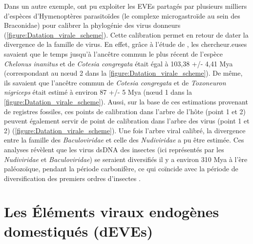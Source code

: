 Dans un autre exemple, \cite{theze_paleozoic_2011} ont  pu exploiter les EVEs partagés par plusieurs milliers d'espèces d'Hymenoptères parasitoïdes (le complexe microgastroïde au sein des Braconidae) pour calibrer la phylogénie des virus donneurs (\figurename{\ref{figure:Datation_virale_scheme}}). Cette calibration permet en retour de dater la divergence de la famille de virus. En effet, grâce à l'étude de \citep{murphy_phylogeny_2008}, les chercheur.euses savaient que le temps jusqu'à l'ancêtre commun le plus récent de l'espèce \textit{Chelonus inanitus} et de \textit{Cotesia congregata} était égal à 103,38 +/- 4,41 Mya (correspondant au nœud 2 dans la \figurename{\ref{figure:Datation_virale_scheme}}). De même, ils savaient que l'ancêtre commun de \textit{Cotesia congregata} et de \textit{Toxoneuron nigriceps} était estimé à environ 87 +/- 5 Mya (nœud 1 dans la \figurename{\ref{figure:Datation_virale_scheme}}). Aussi, sur la base de ces estimations provenant de registres fossiles, ces points de calibration dans l'arbre de l'hôte (point 1 et 2) peuvent également servir de point de calibration dans l'arbre des virus (point 1 et 2) (\figurename{\ref{figure:Datation_virale_scheme}}). Une fois l'arbre viral calibré, la divergence entre la famille des \textit{Baculoviridae} et celle des \textit{Nudiviridae} a pu être estimée. Ces analyses révèlent que les virus dsDNA des insectes (ici représentés par les \textit{Nudiviridae} et \textit{Baculoviridae}) se seraient diversifiés il y a environ 310 Mya à l'ère paléozoïque, pendant la période carbonifère, ce qui coïncide avec la période de diversification des premiers ordres d'insectes \citep{theze_paleozoic_2011}. 

\section{Les Éléments viraux endogènes domestiqués (dEVEs)}

